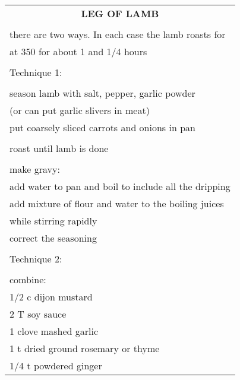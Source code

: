 \documentclass[8pt]{report}
\begin{document}
\begin{tabular}{|l|} \hline	%
 
\multicolumn{1}{|c|}{\textbf{LEG OF LAMB}}
\\
\\

\index{fish/meat!leg of lamb} \index{leg of lamb} \index{lamb!leg of}

there are two ways.  In each case the lamb roasts for\\
at 350 for about 1 and 1/4 hours\\
\\
Technique 1:\\
\\
season lamb with salt, pepper, garlic powder\\
(or can put garlic slivers in meat)\\
put coarsely sliced carrots and onions in pan\\
\\
roast until lamb is done\\
\\
make gravy:\\
\hspace{0.5 in}	add water to pan and boil to include all the
dripping\\
\hspace{0.5 in}	add mixture of flour and water to the boiling juices\\
\hspace{0.5 in}	while stirring rapidly\\
\hspace{0.5 in}	correct the seasoning\\
\\
Technique 2:\\
\\
combine:\\
\hspace{0.5 in}	1/2 c dijon mustard\\
\hspace{0.5 in}	2 T soy sauce\\
\hspace{0.5 in}	1 clove mashed garlic\\
\hspace{0.5 in}	1 t dried ground rosemary or thyme\\
\hspace{0.5 in}	1/4 t powdered ginger\\

\end{tabular}
\end{document}
